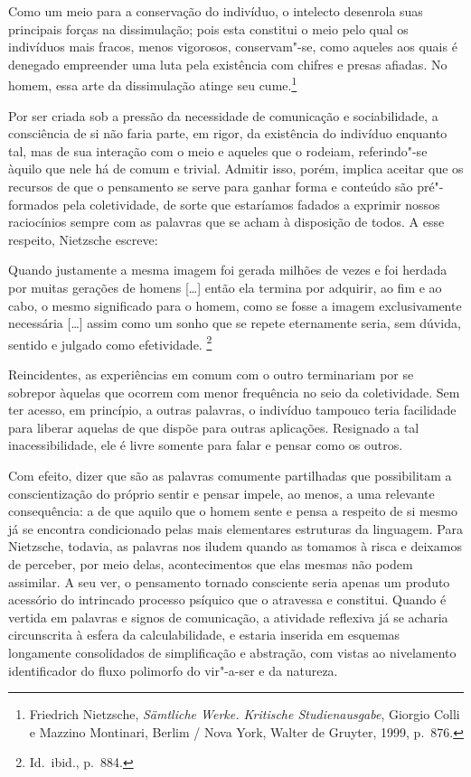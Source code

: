 \begin{hedraquote}
Como um meio para a
conservação do indivíduo, o intelecto desenrola suas principais forças
na dissimulação; pois esta constitui o meio pelo qual os indivíduos
mais fracos, menos vigorosos, conservam"-se, como aqueles aos quais é
denegado empreender uma luta pela existência com chifres e presas
afiadas. No homem, essa arte da dissimulação atinge seu
cume.\footnote{ Friedrich Nietzsche, \textit{Sämtliche Werke.
Kritische Studienausgabe}, Giorgio Colli e Mazzino Montinari,
Berlim / Nova York, Walter de Gruyter, 1999, p.~876.}
\end{hedraquote}

Por ser criada sob a pressão da necessidade de comunicação e sociabilidade, a
consciência de si não faria parte, em rigor, da existência do indivíduo
enquanto tal, mas de sua interação com o meio e aqueles que o rodeiam,
referindo"-se àquilo que nele há de comum e trivial. Admitir isso, porém,
implica aceitar que os recursos de que o pensamento se serve para
ganhar forma e conteúdo são pré"-formados pela coletividade, de sorte
que estaríamos fadados a exprimir nossos raciocínios sempre com as
palavras que se acham à disposição de todos. A esse respeito, Nietzsche
escreve:

\begin{hedraquote}
Quando justamente a mesma imagem foi gerada milhões de vezes
e foi herdada por muitas gerações de homens [\ldots{}] então ela termina por
adquirir, ao fim e ao cabo, o mesmo significado para o homem, como se
fosse a imagem exclusivamente necessária [\dots] assim como um sonho que
se repete eternamente seria, sem dúvida, sentido e julgado como
efetividade. \footnote{ Id.~ibid., p.~884.} 
\end{hedraquote}

Reincidentes,
as experiências em comum com o outro terminariam por se sobrepor
àquelas que ocorrem com menor frequência no seio da coletividade. Sem
ter acesso, em princípio, a outras palavras, o indivíduo tampouco
teria facilidade para liberar aquelas de que dispõe para outras
aplicações. Resignado a tal inacessibilidade, ele é livre somente
para falar e pensar como os outros.

Com efeito, dizer que são as palavras comumente partilhadas que
possibilitam a conscientização do próprio sentir e pensar impele,
ao menos, a uma relevante consequência: a de que aquilo que o homem
sente e pensa a respeito de si mesmo já se encontra
condicionado pelas mais elementares estruturas da linguagem. 
Para Nietzsche, todavia, as palavras nos iludem quando as
tomamos à risca e deixamos de perceber, por meio delas, acontecimentos
que elas mesmas não podem assimilar. A seu ver, o pensamento 
tornado consciente seria apenas um produto acessório do intrincado
processo psíquico que o atravessa e constitui. 
Quando é vertida em palavras e
signos de comunicação, a atividade reflexiva já se acharia circunscrita
à esfera da calculabilidade, e estaria inserida em esquemas longamente
consolidados de simplificação e abstração, com vistas ao nivelamento
identificador do fluxo polimorfo do vir"-a{}-ser e da natureza.

